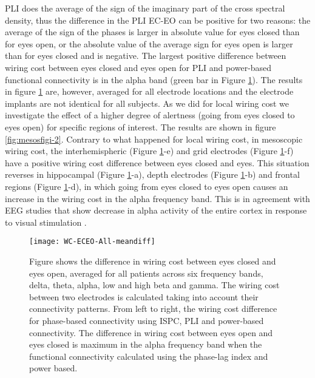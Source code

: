 \documentclass[11pt, onecolumn]{article}
\begin{document}
PLI does the average of the sign of the imaginary part of the cross spectral density, thus the difference in the PLI EC-EO can be positive for two reasons: the average of the sign of the phases is larger in absolute value for eyes closed than for eyes open, or the absolute value of the average sign for eyes open is larger than for eyes closed and is negative.
The largest positive difference between wiring cost between eyes closed and eyes open for PLI and power-based functional connectivity is in the alpha band (green bar in Figure \ref{fig:mesosfigi-1}).
The results in figure \ref{fig:mesosfigi-1} are, however, averaged for all electrode locations and the electrode implants are not identical for all subjects. As we did for local wiring cost we investigate the effect of a higher degree of alertness (going from eyes closed to eyes open) for specific regions of interest. The results are shown in figure \ref{fig:mesosfigi-2}. Contrary to what happened for local wiring cost, in mesoscopic wiring cost, the interhemispheric (Figure \ref{fig:mesosfigi-1}-e) and grid electrodes (Figure \ref{fig:mesosfigi-1}-f) have a positive wiring cost difference between eyes closed and eyes.
This situation reverses in hippocampal (Figure \ref{fig:mesosfigi-1}-a), depth electrodes (Figure \ref{fig:mesosfigi-1}-b) and frontal regions (Figure \ref{fig:mesosfigi-1}-d), in which going from eyes closed to eyes open causes an increase in the wiring cost in  the alpha frequency band. This is in agreement with EEG studies that show decrease in alpha activity of the entire cortex in response to visual stimulation \citep{barry2007eeg}.

\begin{figure}[h]
        \centering
        \texttt{[image: WC-ECEO-All-meandiff]}
        \caption{Figure shows the difference in wiring cost between eyes closed and eyes open, averaged for all patients across six frequency bands, delta, theta, alpha, low and high beta and gamma. The wiring cost between two electrodes is calculated taking into account their connectivity patterns. From left to right, the wiring cost difference for phase-based connectivity using ISPC, PLI and power-based connectivity. The difference in wiring cost between eyes open and eyes closed is maximum in the alpha frequency band when the functional connectivity calculated using the phase-lag index and power based.}
        \label{fig:mesosfigi-1}
\end{figure}
\end{document}
